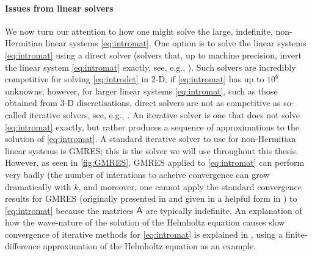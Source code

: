 \paragraph{Issues from linear solvers} We now turn our attention to how one might solve the large, indefinite, non-Hermitian linear systems \eqref{eq:intromat}. One option is to solve the linear systems \eqref{eq:intromat} using a direct solver (solvers that, up to machine precision, invert the linear system \eqref{eq:intromat} exactly, see, e.g., \cite{DuErRe:17}). Such solvers are incredibly competitive for solving \eqref{eq:introdet} in 2-D, if \eqref{eq:intromat} has up to $10^6$ unknowns; however, for larger linear systems \eqref{eq:intromat}, such as those obtained from 3-D discretisations, direct solvers are not as competitive as so-called iterative solvers, see, e.g., \cite[p. 70]{ElSiWa:14}. An iterative solver is one that does not solve \eqref{eq:intromat} exactly, but rather produces a sequence of approximations to the solution of \eqref{eq:intromat}. A standard iterative solver to use for non-Hermitian linear systems is GMRES; this is the solver we will use throughout this thesis. However, as seen in \cref{fig:GMRES}, GMRES applied to \eqref{eq:intromat} can perform very badly (the number of interations to acheive convergence can grow dramatically with $k$, and moreover, one cannot apply the standard convergence results for GMRES (originally presented in \cite{El:82} and given in a helpful form in \cite[Section 1]{BeGoTy:06}) to \eqref{eq:intromat} because the matrices $\mathsf{A}$ are typically indefinite. An explanation of how the wave-nature of the solution of the Helmholtz equation causes slow convergence of iterative methods for \eqref{eq:intromat} is explained in \cite[Section 2.1]{ErGa:12}, using a finite-difference approximation of the Helmholtz equation as an example.

